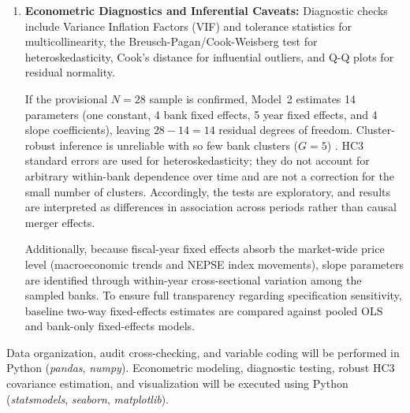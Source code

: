\begin{enumerate}
\begin{itemize}
    \item \textit{Bonus Share Adjustment:} Model~2 is re-estimated with bonus-adjusted BVPS as a sensitivity check; the primary EPS series is unchanged.
    \item \textit{Restated EPS Sensitivity:} Model~2 is re-estimated using subsequent audited restatements of EPS where reported, using the restated values as published rather than applying a mechanical adjustment rule.
  \end{itemize}
  \item \textbf{Econometric Diagnostics and Inferential Caveats:}
  Diagnostic checks include Variance Inflation Factors (VIF) and tolerance statistics for multicollinearity, the Breusch-Pagan/Cook-Weisberg test for heteroskedasticity, Cook's distance for influential outliers, and Q-Q plots for residual normality.
  
  \begin{sloppypar}
  If the provisional $N = 28$ sample is confirmed, Model~2 estimates 14 parameters (one constant, 4 bank fixed effects, 5 year fixed effects, and 4 slope coefficients), leaving $28 - 14 = 14$ residual degrees of freedom. Cluster-robust inference is unreliable with so few bank clusters ($G = 5$) \citep{cameron2008clusters}. HC3 standard errors are used for heteroskedasticity; they do not account for arbitrary within-bank dependence over time and are not a correction for the small number of clusters. Accordingly, the tests are exploratory, and results are interpreted as differences in association across periods rather than causal merger effects.
  \end{sloppypar}
  
  Additionally, because fiscal-year fixed effects absorb the market-wide price level (macroeconomic trends and NEPSE index movements), slope parameters are identified through within-year cross-sectional variation among the sampled banks. To ensure full transparency regarding specification sensitivity, baseline two-way fixed-effects estimates are compared against pooled OLS and bank-only fixed-effects models.
\end{enumerate}

Data organization, audit cross-checking, and variable coding will be performed in Python (\textit{pandas}, \textit{numpy}). Econometric modeling, diagnostic testing, robust HC3 covariance estimation, and visualization will be executed using Python (\textit{statsmodels}, \textit{seaborn}, \textit{matplotlib}).
